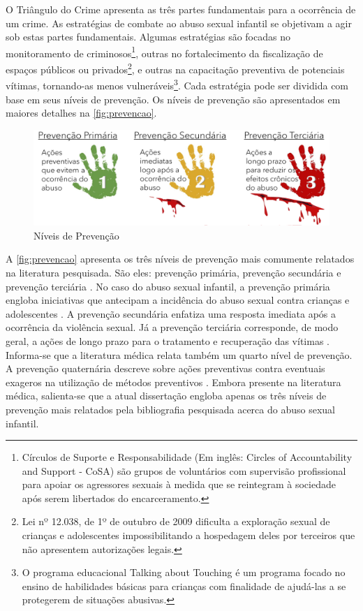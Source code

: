 
O Triângulo do Crime apresenta as três partes fundamentais para a ocorrência de um crime. As estratégias de combate ao abuso sexual infantil se objetivam a agir sob estas partes fundamentais. Algumas estratégias são focadas no monitoramento de criminosos\footnote{\label{note:nota1}Círculos de Suporte e Responsabilidade (Em inglês: Circles of Accountability and Support - CoSA) são grupos de voluntários com supervisão profissional para apoiar os agressores sexuais à medida que se reintegram à sociedade após serem libertados do encarceramento.}, outras no fortalecimento da fiscalização de espaços públicos ou privados\footnote{Lei nº 12.038, de 1º de outubro de 2009 dificulta a exploração sexual de crianças e adolescentes impossibilitando a hospedagem deles por terceiros que não apresentem autorizações legais.}, e outras na capacitação preventiva de potenciais vítimas, tornando-as menos vulneráveis\footnote{O programa educacional Talking about Touching é um programa focado no ensino de habilidades básicas para crianças com finalidade de ajudá-las a se protegerem de situações abusivas.}. Cada estratégia pode ser dividida com base em seus níveis de prevenção. Os níveis de prevenção são apresentados em maiores detalhes na \autoref{fig:prevencao}.

\begin{figure}[htb]
	\caption{\label{fig:prevencao}Níveis de Prevenção}
  \begin{center}
    \includegraphics[width=\linewidth]{./Figuras/Prevencao.pdf}
	\end{center}
\end{figure}

A \autoref{fig:prevencao} apresenta os três níveis de prevenção mais comumente relatados na literatura pesquisada. São eles: prevenção primária, prevenção secundária e prevenção terciária \cite{dahlberg2006violencia, santos2011guia, maria2012abusos}. No caso do abuso sexual infantil, a prevenção primária engloba iniciativas que antecipam a incidência do abuso sexual contra crianças e adolescentes  \cite{marcelino2017vamos}. A prevenção secundária enfatiza uma resposta imediata após a ocorrência da violência sexual. Já a prevenção terciária corresponde, de modo geral, a ações de longo prazo para o tratamento e recuperação das vítimas \cite{people2020expert}. Informa-se que a literatura médica relata também um quarto nível de prevenção. A prevenção quaternária descreve sobre ações preventivas contra eventuais exageros na utilização de métodos preventivos \cite{tesser2017importante}. Embora presente na literatura médica, salienta-se que a atual dissertação engloba apenas os três níveis de prevenção mais relatados pela bibliografia pesquisada acerca do abuso sexual infantil.

